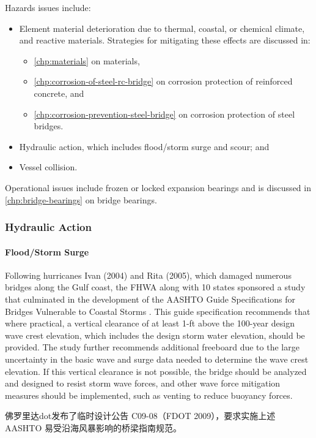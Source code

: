 Hazards issues include:
\begin{itemize}
  \item Element material deterioration due to thermal, coastal, or chemical climate, and reactive materials.
  Strategies for mitigating these effects are discussed in:
  \begin{itemize}
    \item \cref{chp:materials} on materials,
    \item \cref{chp:corrosion-of-steel-rc-bridge} on corrosion protection of reinforced concrete, and
    \item \cref{chp:corrosion-prevention-steel-bridge} on corrosion protection of steel bridges.
  \end{itemize}
  \item Hydraulic action, which includes flood/storm surge and scour; and
  \item  Vessel collision.
\end{itemize}
Operational issues include frozen or locked expansion bearings and is discussed in \cref{chp:bridge-bearings} on bridge
bearings.

\subsubsection*{Hydraulic Action}
\paragraph*{Flood/Storm Surge}
Following hurricanes Ivan (2004) and Rita (2005), which damaged numerous bridges along the Gulf coast, the FHWA along with 10 states sponsored a study that culminated in the development of the AASHTO Guide Specifications for Bridges Vulnerable to Coastal Storms \cite{aashto2008g}. This guide specification recommends that where practical, a vertical clearance of at least 1-ft above the 100-year design wave crest elevation, which includes the design storm water elevation, should be provided. The study further recommends additional freeboard due to the large uncertainty in the basic wave and surge data needed to determine the wave crest elevation. If this vertical clearance is not possible, the bridge should be analyzed and designed to resist storm wave forces, and other wave force mitigation measures should be implemented, such as venting to reduce buoyancy forces.

佛罗里达\acrlong*{dot}发布了临时设计公告 C09-08（FDOT 2009），要求实施上述 AASHTO 易受沿海风暴影响的桥梁指南规范。

